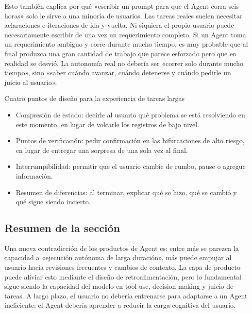 Esto también explica por qué «escribir un prompt para que el Agent corra seis horas» solo le sirve a una minoría de usuarios. Las tareas reales suelen necesitar aclaraciones e iteraciones de ida y vuelta. Ni siquiera el propio usuario puede necesariamente escribir de una vez un requerimiento completo. Si un Agent toma un requerimiento ambiguo y corre durante mucho tiempo, es muy probable que al final produzca una gran cantidad de trabajo que parece esforzado pero que en realidad se desvió. La autonomía real no debería ser «correr solo durante mucho tiempo», sino «saber cuándo avanzar, cuándo detenerse y cuándo pedirle un juicio al usuario».

\begin{knowledgebox}{Cuatro puntos de diseño para la experiencia de tareas largas}
\begin{itemize}
  \item Compresión de estado: decirle al usuario qué problema se está resolviendo en este momento, en lugar de volcarle los registros de bajo nivel.
  \item Puntos de verificación: pedir confirmación en las bifurcaciones de alto riesgo, en lugar de entregar una sorpresa de una sola vez al final.
  \item Interrumpibilidad: permitir que el usuario cambie de rumbo, pause o agregue información.
  \item Resumen de diferencias: al terminar, explicar qué se hizo, qué se cambió y qué sigue siendo incierto.
\end{itemize}
\end{knowledgebox}

\subsection{Resumen de la sección}

Una nueva contradicción de los productos de Agent es: entre más se parezca la capacidad a «ejecución autónoma de larga duración», más puede empujar al usuario hacia revisiones frecuentes y cambios de contexto. La capa de producto puede aliviar esto mediante el diseño de retroalimentación, pero lo fundamental sigue siendo la capacidad del modelo en tool use, decision making y juicio de tareas. A largo plazo, el usuario no debería entrenarse para adaptarse a un Agent ineficiente; el Agent debería aprender a reducir la carga cognitiva del usuario.

